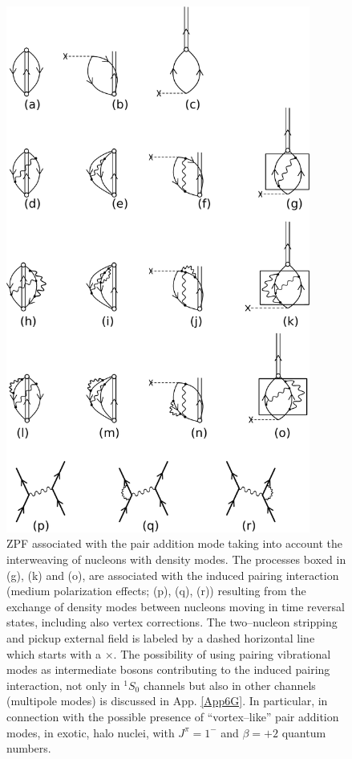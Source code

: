 \clearpage
\begin{figure}[h!]
\centerline {
\includegraphics*[width=10cm]{introduccion/figs/figintroA3}
}
\caption{ZPF associated with the pair addition mode taking into account the interweaving of nucleons with density modes. The processes boxed in (g), (k) and (o), are associated with the induced pairing interaction (medium polarization effects; (p), (q), (r)) resulting from the exchange of density modes between nucleons moving in time reversal states, including also vertex corrections. The two--nucleon stripping and pickup external field is labeled by a dashed horizontal line which starts with a $\times$. The possibility of using pairing vibrational modes as intermediate bosons contributing to the induced pairing interaction, not only in $^1S_0$ channels but also in other channels (multipole modes) is discussed in App. \ref{App6G}. In particular, in connection with the possible presence of ``vortex--like'' pair addition modes, in exotic, halo nuclei, with $J^\pi=1^-$ and $\beta=+2$ quantum numbers.}
\label{figintroA3}
\end{figure}
\clearpage

